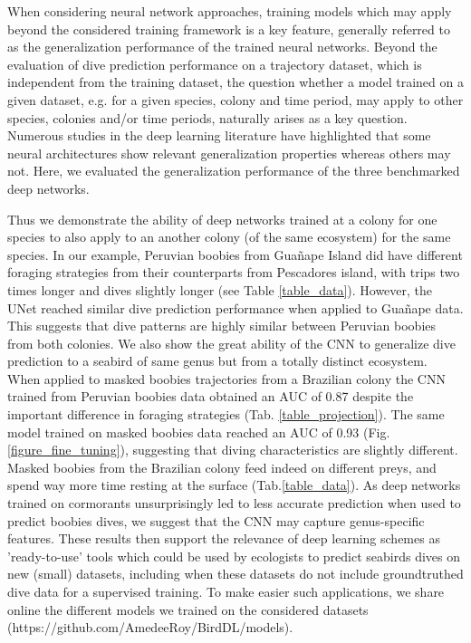 \documentclass{article}
\begin{document}
When considering neural network approaches, training models which may apply beyond the considered training framework is a key feature, generally referred to as the generalization performance of the trained neural networks. Beyond the evaluation of dive prediction performance on a trajectory dataset, which is independent from the training dataset, the question whether a model trained on a given dataset, e.g. for a given species, colony and time period, may apply to other species, colonies and/or time periods, naturally arises as a key question. Numerous studies in the deep learning literature \cite{kawaguchi_generalization_2020,zhang_understanding_2017} have highlighted that some neural architectures show relevant generalization properties whereas others may not. Here, we evaluated the generalization performance of the three benchmarked deep networks.

Thus we demonstrate the ability of deep networks trained at a colony for one species to also apply to an another colony (of the same ecosystem) for the same species. In our example, Peruvian boobies from Guañape Island did have different foraging strategies from their counterparts from Pescadores island, with trips two times longer and dives slightly longer (see Table \ref{table_data}). However, the UNet reached similar dive prediction performance when applied to Guañape data. This suggests that dive patterns are highly similar between Peruvian boobies from both colonies. We also show the great ability of the CNN to generalize dive prediction to a seabird of same genus but from a totally distinct ecosystem. When applied to masked boobies trajectories from a Brazilian colony the CNN trained from Peruvian boobies data obtained an AUC of 0.87 despite the important difference in foraging strategies (Tab. \ref{table_projection}). The same model trained on masked boobies data reached an AUC of 0.93 (Fig. \ref{figure_fine_tuning}), suggesting that diving characteristics are slightly different. Masked boobies from the Brazilian colony feed indeed on different preys, and spend way more time resting at the surface (Tab.\ref{table_data}). As deep networks trained on cormorants unsurprisingly led to less accurate prediction when used to predict boobies dives, we suggest that the CNN may capture genus-specific features. These results then support the relevance of deep learning schemes as 'ready-to-use' tools which could be used by ecologists to predict seabirds dives on new (small) datasets, including when these datasets do not include groundtruthed dive data for a supervised training. To make easier such applications, we share online the different models we trained on the considered datasets (https://github.com/AmedeeRoy/BirdDL/models).
\end{document}
